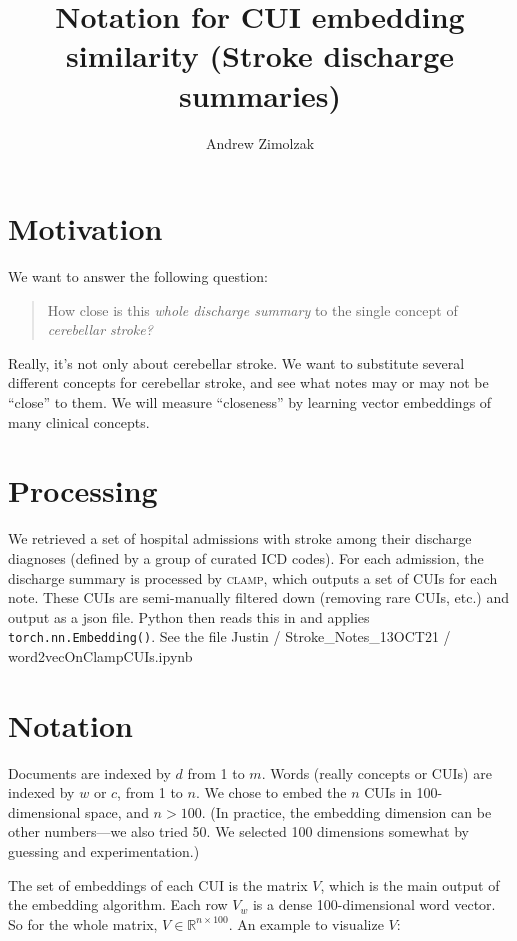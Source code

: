 \documentclass{article}
\title{Notation for CUI embedding similarity (Stroke discharge summaries)}
\author{Andrew Zimolzak}
\begin{document}
\maketitle

\section*{Motivation}

We want to answer the following question:

\begin{quote}
  How close is this \emph{whole discharge summary} to the single
  concept of \emph{cerebellar stroke?}
\end{quote}

Really, it's not only about cerebellar stroke. We want to substitute
several different concepts for cerebellar stroke, and see what notes
may or may not be ``close'' to them. We will measure ``closeness'' by
learning vector embeddings of many clinical concepts.

\section*{Processing}

We retrieved a set of hospital admissions with stroke among their
discharge diagnoses (defined by a group of curated ICD codes). For
each admission, the discharge summary is processed by \textsc{clamp},
which outputs a set of CUIs for each note. These CUIs are
semi-manually filtered down (removing rare CUIs, etc.) and output as a
json file. Python then reads this in and applies
\texttt{torch.nn.Embedding()}. See the file Justin /
Stroke\_Notes\_13OCT21 / word2vecOnClampCUIs.ipynb

\section*{Notation}

Documents are indexed by $d$ from 1 to $m$. Words (really concepts or
CUIs) are indexed by $w$ or $c$, from 1 to $n$. We chose to embed the
$n$ CUIs in 100-dimensional space, and $n > 100$. (In practice, the
embedding dimension can be other numbers---we also tried 50. We
selected 100 dimensions somewhat by guessing and experimentation.)

The set of embeddings of each CUI is the matrix $V$, which is the main
output of the embedding algorithm. Each row $V_w$ is a dense
100-dimensional word vector. So for the whole matrix, $V \in
\mathbb{R}^{n \times 100}$. An example to visualize $V$:
\end{document}
